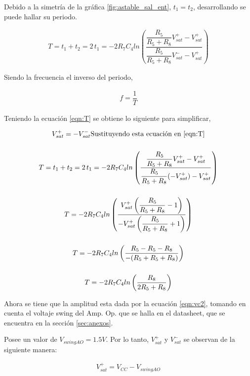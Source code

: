 \begin{enumerate}
\begin{itemize}
                        Debido a la simetría de la gráfica \ref{fig:astable_sal_ent}, $t_1=t_2$, desarrollando se puede hallar su periodo.

                        \begin{gather}
                            T=t_1+t_2=2 \, t_1=-2R_7C_4ln\left(\dfrac{\dfrac{R_5}{R_5+R_8}V_{sat}^+-V_{sat}^+}{\dfrac{R_5}{R_5+R_8}V_{sat}^--V_{sat}^+}\right) \label{eqn:T}
                        \end{gather}

                        Siendo la frecuencia el inverso del periodo,

                        \begin{gather}
                            f=\dfrac{1}{T} \label{eqn:f}
                        \end{gather}

                        Teniendo la ecuación \ref{eqn:T} se obtiene lo siguiente para simplificar,

                        \begin{gather}
                            V_{sat}^+=-V_{sat}^- \text{Sustituyendo esta ecuación en \ref{eqn:T}} \nonumber \\[0.5cm]
                            T=t_1+t_2=2 \, t_1=-2R_7C_4ln\left(\dfrac{\dfrac{R_5}{R_5+R_8}V_{sat}^+-V_{sat}^+}{\dfrac{R_5}{R_5+R_8}(-V_{sat}^+)-V_{sat}^+}\right) \nonumber \\[0.5cm]
                            T=-2R_7C_4 ln\left(\dfrac{V_{sat}^+\left(\dfrac{R_5}{R_5+R_8}-1\right)}{-V_{sat}^+\left(\dfrac{R_5}{R_5+R_8}+1\right)}\right) \nonumber \\[0.5cm]
                            T=-2R_7C_4 ln\left(\dfrac{R_5-R_5-R_8}{-(R_5+R_5+R_8)}\right)\nonumber \\[0.5cm]
                            T=-2R_7C_4 ln\left(\dfrac{R_8}{2R_5+R_8}\right) \label{eqn:T2}
                        \end{gather}

                        Ahora se tiene que la amplitud esta dada por la ecuación \ref{eqn:vc2}, tomando en cuenta el voltaje swing del Amp. Op. que se halla en el datasheet, que se encuentra en la sección \ref{sec:anexos}.

                        Posee un valor de $V_{swingAO}=1.5V$. Por lo tanto, $V_{sat}^+$ y $V_{sat}^-$  se observan de la siguiente manera:

                        \begin{gather}
                            V_{sat}^+=V_{CC}-V_{swingAO} \label{eqn:vsat2}
                        \end{gather}


\end{itemize}
\end{enumerate}
